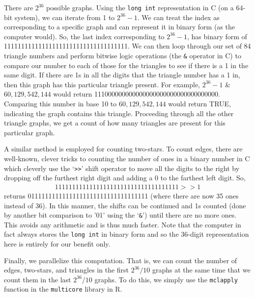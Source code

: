 There are $2^{36}$ possible graphs.  Using the \texttt{long int} representation in C (on a 64-bit system), we can iterate from 1 to $2^{36}-1$.  We can treat the index as corresponding to a specific graph and can represent it in binary form (as the computer would).  So, the last index corresponding to $2^{36}-1$, has binary form of 111111111111111111111111111111111111.  We can then loop through our set of 84 triangle numbers and perform bitwise logic operations (the \texttt{\&} operator in C) to compare our number to each of those for the triangles to see if there is a 1 in the same digit.  If there are 1s in all the digits that the triangle number has a 1 in, then this graph has this particular triangle present.
For example, $2^{36}-1$ \& $60,129,542,144$ would return 111000000000000000000000000000000000.  Comparing this number in base 10 to $60,129,542,144$ would return TRUE, indicating the graph contains this triangle.  Proceeding through all the other triangle graphs, we get a count of how many triangles are present for this particular graph.

A similar method is employed for counting two-stars.  To count edges, there are well-known, clever tricks to counting the number of ones in a binary number in C which cleverly use the `\texttt{>>}' shift operator to move all the digits to the right by dropping off the furthest right digit and adding a 0 to the farthest left digit.  So, 
\begin{align*}
111111111111111111111111111111111111 >> 1
\end{align*}
returns 01111111111111111111111111111111111 (where there are now 35 ones instead of 36).  In this manner, the shifts can be continued and 1s counted (done by another bit comparison to '01' using the `\texttt{\&}') until there are no more ones.  This avoids any arithmetic and is thus much faster.  Note that the computer in fact always stores 
the \texttt{long int} in binary form and so the 36-digit representation here is entirely for our benefit only.

Finally, we parallelize this computation.  That is, we can count the number of edges, two-stars, and triangles in the first $2^{36}/10$ graphs at the same time that we count them in the last $2^{36}/10$ graphs.  To do this, we simply use the \texttt{mclapply} function in the \texttt{multicore} library in R.



